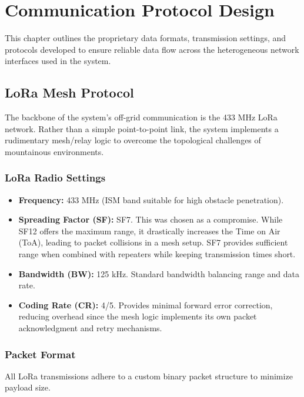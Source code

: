 \chapter{Communication Protocol Design}
\label{ch:communication-protocols}

This chapter outlines the proprietary data formats, transmission settings, and protocols developed to ensure reliable data flow across the heterogeneous network interfaces used in the system.

\section{LoRa Mesh Protocol}
The backbone of the system's off-grid communication is the 433 MHz LoRa network. Rather than a simple point-to-point link, the system implements a rudimentary mesh/relay logic to overcome the topological challenges of mountainous environments.

\subsection{LoRa Radio Settings}
\begin{itemize}
    \item \textbf{Frequency:} 433 MHz (ISM band suitable for high obstacle penetration).
    \item \textbf{Spreading Factor (SF):} SF7. This was chosen as a compromise. While SF12 offers the maximum range, it drastically increases the Time on Air (ToA), leading to packet collisions in a mesh setup. SF7 provides sufficient range when combined with repeaters while keeping transmission times short.
    \item \textbf{Bandwidth (BW):} 125 kHz. Standard bandwidth balancing range and data rate.
    \item \textbf{Coding Rate (CR):} 4/5. Provides minimal forward error correction, reducing overhead since the mesh logic implements its own packet acknowledgment and retry mechanisms.
\end{itemize}

\subsection{Packet Format}
All LoRa transmissions adhere to a custom binary packet structure to minimize payload size. 

